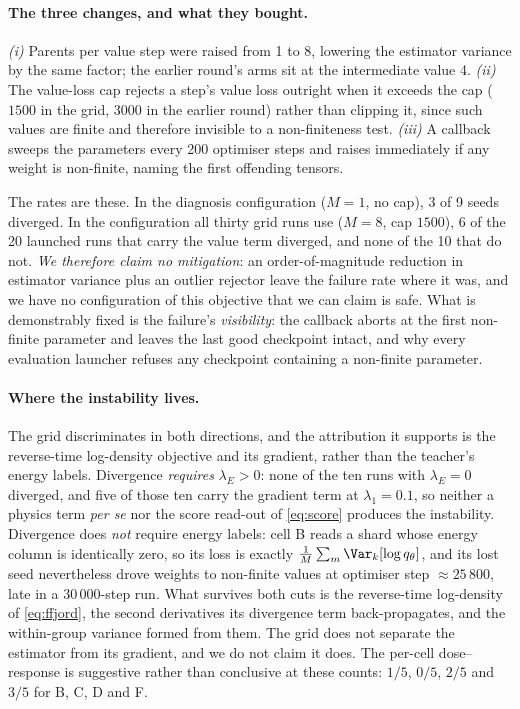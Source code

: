 \paragraph{The three changes, and what they bought.} \emph{(i)} Parents per value step
were raised from 1 to 8, lowering the estimator variance by the same factor; the
earlier round's arms sit at the intermediate value 4. \emph{(ii)} The value-loss cap
rejects a step's value loss outright when it exceeds the cap ($1500$ in the grid,
$3000$ in the earlier round) rather than clipping it, since such values are finite and
therefore invisible to a non-finiteness test. \emph{(iii)} A callback sweeps the
parameters every 200 optimiser steps and raises immediately if any weight is
non-finite, naming the first offending tensors.

The rates are these. In the diagnosis configuration ($M = 1$, no cap), 3 of 9 seeds
diverged. In the configuration all thirty grid runs use ($M = 8$, cap $1500$), 6 of the
20 launched runs that carry the value term diverged, and none of the 10 that do not.
\emph{We therefore claim no mitigation}: an order-of-magnitude reduction in estimator
variance plus an outlier rejector leave the failure rate where it was, and we have no
configuration of this objective that we can claim is safe. What is demonstrably fixed
is the failure's \emph{visibility}: the callback aborts at the first non-finite
parameter and leaves the last good checkpoint intact, and why every evaluation
launcher refuses any checkpoint containing a non-finite parameter.

\paragraph{Where the instability lives.} The grid discriminates in both directions, and
the attribution it supports is the reverse-time log-density objective and its gradient,
rather than the teacher's energy labels.
Divergence \emph{requires} $\lambda_E > 0$: none of the ten runs with $\lambda_E = 0$
diverged, and five of those ten carry the gradient term at $\lambda_1 = 0.1$, so
neither a physics term \emph{per se} nor the score read-out of \eqref{eq:score}
produces the instability. Divergence does \emph{not} require energy labels: cell B
reads a shard whose energy column is identically zero, so its loss is exactly
$\frac{1}{M}\sum_m \Var_k[\log q_\theta]$, and its lost seed nevertheless drove weights
to non-finite values at optimiser step $\approx 25\,800$, late in a $30\,000$-step run.
What survives both cuts is the reverse-time log-density of \eqref{eq:ffjord}, the second
derivatives its divergence term back-propagates, and the within-group variance formed
from them. The grid does not separate the estimator from its gradient, and
we do not claim it does. The per-cell dose--response is suggestive rather than
conclusive at these counts: $1/5$, $0/5$, $2/5$ and $3/5$ for B, C, D and F.

